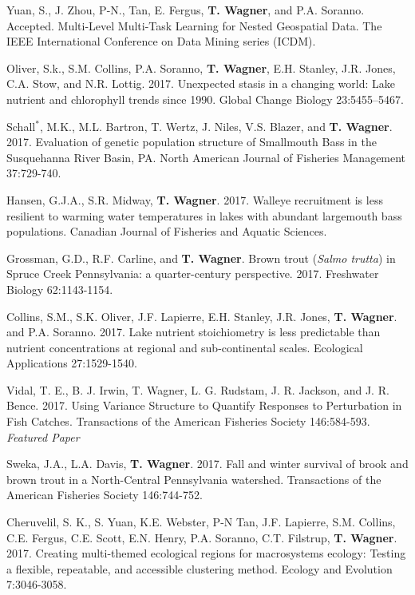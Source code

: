 \documentclass[10pt]{article}
\begin{document}
\begin{flushleft}
\begin{etaremune}[start=70]
\item Yuan, S., J. Zhou, P-N., Tan, E. Fergus, {\bf T. Wagner}, and P.A. Soranno. Accepted. Multi-Level Multi-Task Learning for Nested Geospatial Data. The IEEE International Conference on Data Mining series (ICDM).

\item Oliver, S.k., S.M. Collins, P.A. Soranno, {\bf T. Wagner}, E.H. Stanley, J.R. Jones, C.A. Stow, and N.R. Lottig. 2017. Unexpected stasis in a changing world: Lake nutrient and chlorophyll trends since 1990. Global Change Biology 23:5455–5467.

\item Schall$^*$, M.K., M.L. Bartron, T. Wertz, J. Niles, V.S. Blazer, and {\bf T. Wagner}. 2017. Evaluation of genetic population structure of Smallmouth Bass in the Susquehanna River Basin, PA. North American Journal of Fisheries Management 37:729-740.

\item Hansen, G.J.A., S.R. Midway, {\bf T. Wagner}. 2017. Walleye recruitment is less resilient to warming water temperatures in lakes with abundant largemouth bass populations. Canadian Journal of Fisheries and Aquatic Sciences.

\item Grossman, G.D., R.F. Carline, and {\bf T. Wagner}. Brown trout (\emph{Salmo trutta}) in Spruce Creek Pennsylvania: a quarter-century perspective. 2017. Freshwater Biology 62:1143-1154.

\item Collins, S.M., S.K. Oliver, J.F. Lapierre, E.H. Stanley, J.R. Jones, {\bf T. Wagner}. and P.A. Soranno. 2017. Lake nutrient stoichiometry is less predictable than nutrient concentrations at regional and sub-continental scales. Ecological Applications 27:1529-1540.

\item Vidal, T. E., B. J. Irwin, T. Wagner, L. G. Rudstam, J. R. Jackson, and J. R. Bence. 2017. Using Variance Structure to Quantify Responses to Perturbation in Fish Catches. Transactions of the American Fisheries Society 146:584-593. \emph{Featured Paper}

\item Sweka, J.A., L.A. Davis, {\bf T. Wagner}. 2017. Fall and winter survival of brook and brown trout in a North-Central Pennsylvania watershed. Transactions of the American Fisheries Society 146:744-752.

\item Cheruvelil, S. K., S. Yuan, K.E. Webster, P-N Tan, J.F. Lapierre, S.M. Collins, C.E. Fergus, C.E. Scott, E.N. Henry, P.A. Soranno, C.T. Filstrup, {\bf T. Wagner}. 2017. Creating multi-themed ecological regions for macrosystems ecology: Testing a flexible, repeatable, and accessible clustering method. Ecology and Evolution 7:3046-3058.


\end{etaremune}
\end{flushleft}
\end{document}

